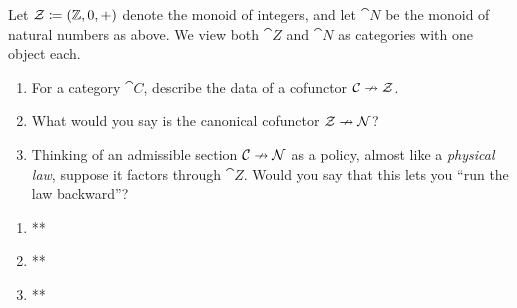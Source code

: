 \documentclass[Book-Poly]{subfiles}
\begin{document}
\begin{exercise}
Let $\mathcal{Z}\coloneqq(\mathbb{Z},0,+)$ denote the monoid of integers, and let $\cat{N}$ be the monoid of natural numbers as above.
We view both $\cat{Z}$ and $\cat{N}$ as categories with one object each.
\begin{enumerate}
	\item For a category $\cat{C}$, describe the data of a cofunctor $\mathcal{C}\nrightarrow\mathcal{Z}$.
	\item What would you say is the canonical cofunctor $\mathcal{Z}\nrightarrow\mathcal{N}$?
	\item Thinking of an admissible section $\mathcal{C}\nrightarrow\mathcal{N}$ as a policy, almost like a \emph{physical law}, suppose it factors through $\cat{Z}$. Would you say that this lets you ``run the law backward''? %
\qedhere
\end{enumerate}
\begin{solution}
\begin{enumerate}
    \item **
    \item **
    \item **
\end{enumerate}
\end{solution}
\end{exercise}
\end{document}
